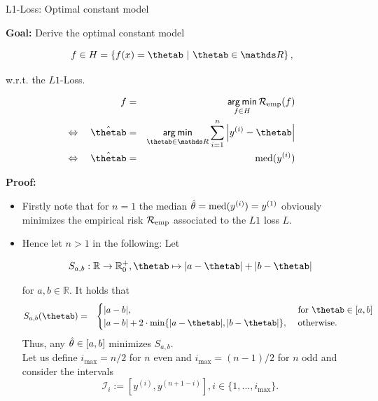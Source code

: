 \begin{vbframe}{L1-Loss: Optimal constant model}


\textbf{Goal:} Derive the optimal constant model 


$$
f \in \Hspace = \left\{\fx = \thetab~|~ \thetab\in \R \right\},
$$

w.r.t. the $L1$-Loss. 

\begin{eqnarray*}
f &=& \argmin_{f \in \Hspace} \riskef\\
\Leftrightarrow \quad \hat \thetab&=& \argmin_{\thetab\in \R} \sum_{i = 1}^n \left|\yi - \thetab\right| \\
\Leftrightarrow \quad \hat \thetab&=& \text{med}(\yi)
\end{eqnarray*}



\framebreak


\textbf{Proof:} 

\begin{itemize}
  \item Firstly note that for $n = 1$ the median $\hat{\theta} = \text{med}(y^{(i)}) = y^{(1)}$ obviously minimizes the empirical risk $\mathcal{R}_{\text{emp}}$ associated to the $L1$ loss $L$. 
  \item Hence let $n > 1$ in the following: Let 

  $$
    S_{a,b}:\mathbb{R} \rightarrow \mathbb{R}^+_0, \thetab \mapsto |a- \thetab| + |b-\thetab|
  $$

  for $a, b \in \mathbb{R}$. It holds that
  \begin{eqnarray*}
  S_{a,b}(\thetab) &=& \begin{cases}|a-b| ,& \text{ for } \thetab \in [a,b]\\ |a-b| + 2\cdot\min\{|a-\thetab|,|b-\thetab|\}
  ,& \text{ otherwise. }\end{cases}
  \end{eqnarray*}
  Thus, any $\hat{\theta} \in [a,b]$ minimizes $S_{a,b}$. \\

  Let us define $i_{\max} = n / 2$ for $n$ even and $i_{\max} = (n - 1) / 2$ for $n$ odd and consider the intervals 
  $$
    \mathcal{I}_i := [y^{(i)},y^{(n+1-i)}], i \in \{1, ..., i_{\max}\}. 
  $$


\end{itemize}
\end{vbframe}

